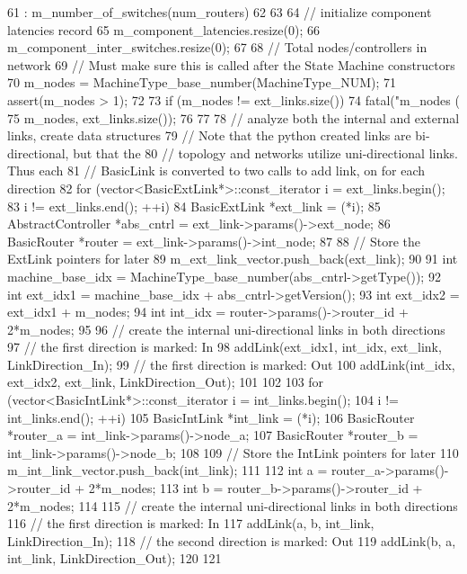 \begin{DoxyCode}
61     : m_number_of_switches(num_routers)
62 {
63 
64     // initialize component latencies record
65     m_component_latencies.resize(0);
66     m_component_inter_switches.resize(0);
67 
68     // Total nodes/controllers in network
69     // Must make sure this is called after the State Machine constructors
70     m_nodes = MachineType_base_number(MachineType_NUM);
71     assert(m_nodes > 1);
72 
73     if (m_nodes != ext_links.size()) {
74         fatal("m_nodes (%
75               m_nodes, ext_links.size());
76     }
77 
78     // analyze both the internal and external links, create data structures
79     // Note that the python created links are bi-directional, but that the
80     // topology and networks utilize uni-directional links.  Thus each 
81     // BasicLink is converted to two calls to add link, on for each direction
82     for (vector<BasicExtLink*>::const_iterator i = ext_links.begin();
83          i != ext_links.end(); ++i) {
84         BasicExtLink *ext_link = (*i);
85         AbstractController *abs_cntrl = ext_link->params()->ext_node;
86         BasicRouter *router = ext_link->params()->int_node;
87 
88         // Store the ExtLink pointers for later
89         m_ext_link_vector.push_back(ext_link);
90 
91         int machine_base_idx = MachineType_base_number(abs_cntrl->getType());
92         int ext_idx1 = machine_base_idx + abs_cntrl->getVersion();
93         int ext_idx2 = ext_idx1 + m_nodes;
94         int int_idx = router->params()->router_id + 2*m_nodes;
95 
96         // create the internal uni-directional links in both directions
97         //   the first direction is marked: In
98         addLink(ext_idx1, int_idx, ext_link, LinkDirection_In);
99         //   the first direction is marked: Out
100         addLink(int_idx, ext_idx2, ext_link, LinkDirection_Out);
101     }
102 
103     for (vector<BasicIntLink*>::const_iterator i = int_links.begin();
104          i != int_links.end(); ++i) {
105         BasicIntLink *int_link = (*i);
106         BasicRouter *router_a = int_link->params()->node_a;
107         BasicRouter *router_b = int_link->params()->node_b;
108 
109         // Store the IntLink pointers for later
110         m_int_link_vector.push_back(int_link);
111 
112         int a = router_a->params()->router_id + 2*m_nodes;
113         int b = router_b->params()->router_id + 2*m_nodes;
114 
115         // create the internal uni-directional links in both directions
116         //   the first direction is marked: In
117         addLink(a, b, int_link, LinkDirection_In);
118         //   the second direction is marked: Out
119         addLink(b, a, int_link, LinkDirection_Out);
120     }
121 }
\end{DoxyCode}


